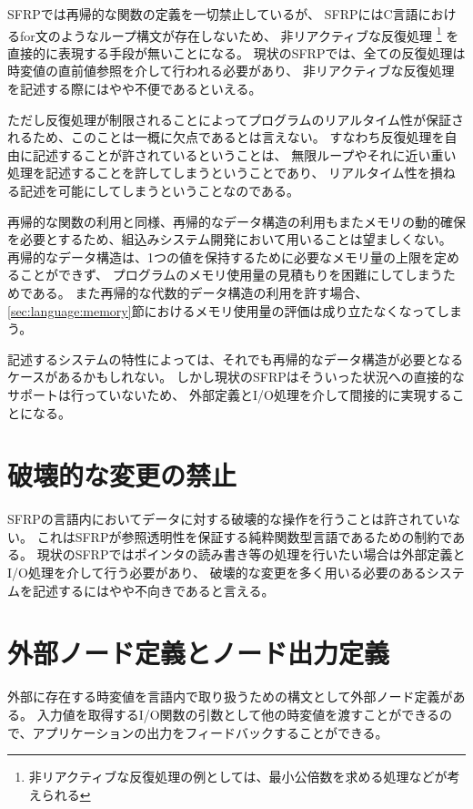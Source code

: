 SFRPでは再帰的な関数の定義を一切禁止しているが、
SFRPにはC言語におけるfor文のようなループ構文が存在しないため、
非リアクティブな反復処理
\footnote{非リアクティブな反復処理の例としては、最小公倍数を求める処理などが考えられる}
を直接的に表現する手段が無いことになる。
現状のSFRPでは、全ての反復処理は時変値の直前値参照を介して行われる必要があり、
非リアクティブな反復処理を記述する際にはやや不便であるといえる。

ただし反復処理が制限されることによってプログラムのリアルタイム性が保証されるため、このことは一概に欠点であるとは言えない。
すなわち反復処理を自由に記述することが許されているということは、
無限ループやそれに近い重い処理を記述することを許してしまうということであり、
リアルタイム性を損ねる記述を可能にしてしまうということなのである。

再帰的な関数の利用と同様、再帰的なデータ構造の利用もまたメモリの動的確保を必要とするため、組込みシステム開発において用いることは望ましくない。
再帰的なデータ構造は、1つの値を保持するために必要なメモリ量の上限を定めることができず、
プログラムのメモリ使用量の見積もりを困難にしてしまうためである。
また再帰的な代数的データ構造の利用を許す場合、
\ref{sec:language:memory}節におけるメモリ使用量の評価は成り立たなくなってしまう。

記述するシステムの特性によっては、それでも再帰的なデータ構造が必要となるケースがあるかもしれない。
しかし現状のSFRPはそういった状況への直接的なサポートは行っていないため、
外部定義とI/O処理を介して間接的に実現することになる。

\section{破壊的な変更の禁止}
SFRPの言語内においてデータに対する破壊的な操作を行うことは許されていない。
これはSFRPが参照透明性を保証する純粋関数型言語であるための制約である。
現状のSFRPではポインタの読み書き等の処理を行いたい場合は外部定義とI/O処理を介して行う必要があり、
破壊的な変更を多く用いる必要のあるシステムを記述するにはやや不向きであると言える。

\section{外部ノード定義とノード出力定義}
外部に存在する時変値を言語内で取り扱うための構文として外部ノード定義がある。
入力値を取得するI/O関数の引数として他の時変値を渡すことができるので、アプリケーションの出力をフィードバックすることができる。

